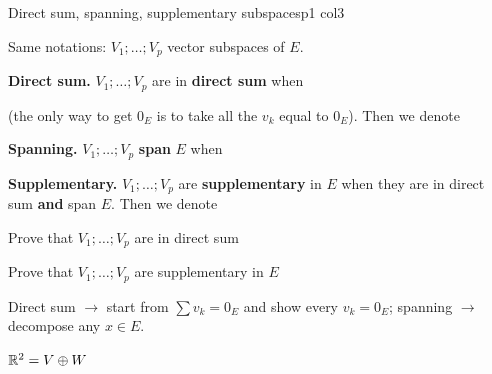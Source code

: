 \documentclass[course,noautoquant,noautokw]{neyvia-study}
\begin{document}
\begin{concept}[1.24]{Direct sum, spanning, supplementary subspaces}{p1 col3}
\begin{definition}
\noindent Same notations: $V_1;\dots;V_p$ vector subspaces of $E$.
\par\noindent \textbf{Direct sum.} $V_1;\dots;V_p$ are in \textbf{direct sum} when
\par\noindent (the only way to get $0_E$ is to take all the $v_k$ equal to $0_E$). Then we denote
\par\noindent \textbf{Spanning.} $V_1;\dots;V_p$ \textbf{span} $E$ when
\par\noindent \textbf{Supplementary.} $V_1;\dots;V_p$ are \textbf{supplementary} in $E$ when they are in direct sum \textbf{and} span $E$. Then we denote
\end{definition}
\begin{method}{Prove that $V_1;\dots;V_p$ are in direct sum}
\step{$\displaystyle \cdots$}
\end{method}
\begin{method}{Prove that $V_1;\dots;V_p$ are supplementary in $E$}
\end{method}
\begin{reflex}
Direct sum \ensuremath{\rightarrow} start from $\sum v_k=0_E$ and show every $v_k=0_E$; spanning \ensuremath{\rightarrow} decompose any $x\in E$.
\end{reflex}
\begin{worked}{$\mathbb{R}^2=V\oplus W$}

\end{worked}
\end{concept}
\end{document}
